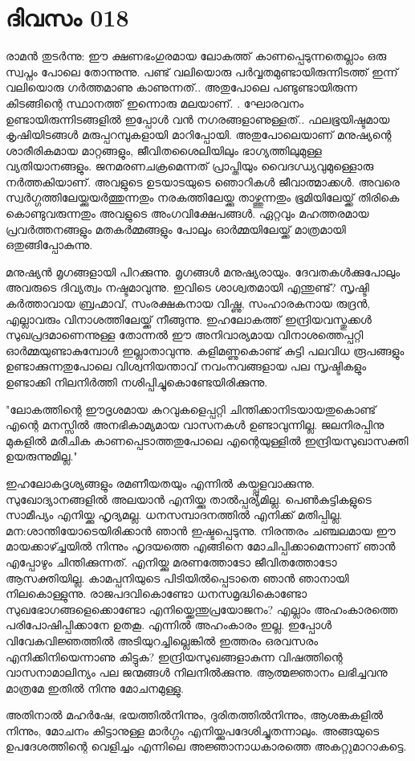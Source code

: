 \newpage
\section{ദിവസം 018}


രാമന്‍ തുടര്‍ന്നു: ഈ ക്ഷണഭംഗുരമായ ലോകത്ത്‌ കാണപ്പെടുന്നതെല്ലാം ഒരു സ്വപ്നം പോലെ തോന്നുന്നു. പണ്ട്‌ വലിയൊരു പര്‍വ്വതമുണ്ടായിരുന്നിടത്ത്‌ ഇന്ന് വലിയൊരു ഗര്‍ത്തമാണു കാണുന്നത്‌.. അതുപോലെ പണ്ടുണ്ടായിരുന്ന കിടങ്ങിന്റെ സ്ഥാനത്ത്‌ ഇന്നൊരു മലയാണ്‌. . ഘോരവനം ഉണ്ടായിരുന്നിടങ്ങളില്‍ ഇപ്പോള്‍ വന്‍ നഗരങ്ങളാണുള്ളത്‌.. ഫലഭൂയിഷ്ടമായ കൃഷിയിടങ്ങള്‍ മരുപ്പറമ്പുകളായി മാറിപ്പോയി. അതുപോലെയാണ്‌ മനുഷ്യന്റെ ശാരീരികമായ മാറ്റങ്ങളും, ജീവിതശൈലിയിലും ഭാഗ്യത്തിലുമുള്ള വ്യതിയാനങ്ങളും. ജനമരണചക്രമെന്നത്‌ പ്രാപ്തിയും വൈദഗ്ധ്യവുമുള്ളൊരു നര്‍ത്തകിയാണ്‌. അവളുടെ ഉടയാടയുടെ ഞൊറികള്‍ ജീവാത്മാക്കള്‍. അവരെ സ്വര്‍ഗ്ഗത്തിലേയ്ക്കുയര്‍ത്തുന്നതും നരകത്തിലേയ്ക്കു താഴ്ത്തുന്നതും ഭൂമിയിലേയ്ക്ക്‌ തിരികെ കൊണ്ടുവരുന്നതും അവളുടെ അംഗവിക്ഷേപങ്ങള്‍. ഏറ്റവും മഹത്തരമായ പ്രവര്‍ത്തനങ്ങളും മതകര്‍മ്മങ്ങളും പോലും ഓര്‍മ്മയിലേയ്ക്ക്‌ മാത്രമായി ഒതുങ്ങിപ്പോകുന്നു.

മനുഷ്യന്‍ മൃഗങ്ങളായി പിറക്കുന്നു. മൃഗങ്ങള്‍ മനുഷ്യരായും. ദേവതകള്‍ക്കുപോലും അവരുടെ ദിവ്യത്വം നഷ്ടമാവുന്നു. ഇവിടെ ശാശ്വതമായി എന്തുണ്ട്‌? സൃഷ്ടി കര്‍ത്താവായ ബ്രഹ്മാവ്‌, സംരക്ഷകനായ വിഷ്ണു, സംഹാരകനായ രുദ്രന്‍, എല്ലാവരും വിനാശത്തിലേയ്ക്ക്‌ നീങ്ങുന്നു. ഇഹലോകത്ത്‌ ഇന്ദ്രിയവസ്തുക്കള്‍ സുഖപ്രദമാണെന്നുള്ള തോന്നല്‍ ഈ അനിവാര്യമായ വിനാശത്തെപ്പറ്റി ഓര്‍മ്മയുണ്ടാകുമ്പോള്‍ ഇല്ലാതാവുന്നു. കളിമണ്ണുകൊണ്ട്‌ കുട്ടി പലവിധ രൂപങ്ങളും ഉണ്ടാക്കുന്നതുപോലെ വിശ്വനിയന്താവ്‌ നവംനവങ്ങളായ പല സൃഷ്ടികളും ഉണ്ടാക്കി നിലനിര്‍ത്തി നശിപ്പിച്ചുകൊണ്ടേയിരിക്കുന്നു.

"ലോകത്തിന്റെ ഈദൃശമായ കുറവുകളെപ്പറ്റി ചിന്തിക്കാനിടയായതുകൊണ്ട്‌ എന്റെ മനസ്സില്‍ അനഭികാമ്യമായ വാസനകള്‍ ഉണ്ടാവുന്നില്ല. ജലനിരപ്പിനു മുകളില്‍ മരീചിക കാണപ്പെടാത്തതുപോലെ എന്റെയുള്ളില്‍ ഇന്ദ്രിയസുഖാസക്തി ഉയരുന്നുമില്ല."

ഇഹലോകദൃശ്യങ്ങളും രമണീയതയും എന്നില്‍ കയ്പ്പുളവാക്കുന്നു. സുഖോദ്യാനങ്ങളില്‍ അലയാന്‍ എനിയ്ക്കു താല്‍പ്പര്യമില്ല. പെണ്‍കുട്ടികളുടെ സാമീപ്യം എനിയ്ക്കു ഹൃദ്യമല്ല. ധനസമ്പാദനത്തില്‍ എനിക്ക്‌ മതിപ്പില്ല. മന:ശാന്തിയോടെയിരിക്കാന്‍ ഞാന്‍ ഇഷ്ടപ്പെടുന്നു. നിരന്തരം ചഞ്ചലമായ ഈ മായക്കാഴ്ച്ചയില്‍ നിന്നും ഹൃദയത്തെ എങ്ങിനെ മോചിപ്പിക്കാമെന്നാണ്‌ ഞാന്‍ എപ്പോഴും ചിന്തിക്കുന്നത്‌. എനിയ്ക്കു മരണത്തോടോ ജീവിതത്തോടോ ആസക്തിയില്ല. കാമപ്പനിയുടെ പിടിയില്‍പ്പെടാതെ ഞാന്‍ ഞാനായി നിലകൊള്ളുന്നു. രാജപദവികൊണ്ടോ ധനസമൃദ്ധികൊണ്ടോ സുഖഭോഗങ്ങളെക്കൊണ്ടോ എനിയ്ക്കെന്തുപ്രയോജനം? എല്ലാം അഹംകാരത്തെ പരിപോഷിപ്പിക്കാനേ ഉതകൂ. എന്നില്‍ അഹംകാരം ഇല്ല. ഇപ്പോള്‍ വിവേകവിജ്ഞത്തില്‍ അടിയുറച്ചില്ലെങ്കില്‍ ഇത്തരം ഒരവസരം എനിക്കിനിയെന്നാണു കിട്ടുക? ഇന്ദ്രിയസുഖങ്ങളാകുന്ന വിഷത്തിന്റെ വാസനാമാലിന്യം പല ജന്മങ്ങള്‍ നിലനില്‍ക്കുന്നു.   ആത്മജ്ഞാനം ലഭിച്ചവനു മാത്രമേ ഇതില്‍ നിന്നു മോചനമുള്ളു. 

അതിനാല്‍ മഹര്‍ഷേ, ഭയത്തില്‍നിന്നും, ദുരിതത്തില്‍നിന്നും, ആശങ്കകളില്‍ നിന്നും, മോചനം കിട്ടാനുള്ള മാര്‍ഗ്ഗം എനിയ്ക്കുപദേശിച്ചുതന്നാലും. അങ്ങയുടെ ഉപദേശത്തിന്റെ വെളിച്ചം എന്നിലെ അജ്ഞാനാധകാരത്തെ അകറ്റുമാറാകട്ടെ.

